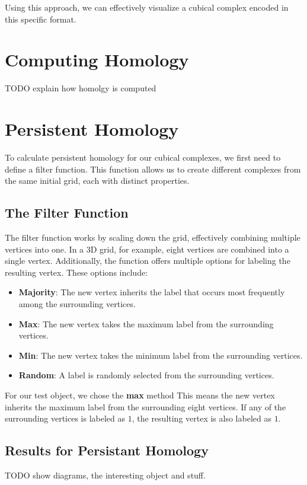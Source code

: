 \documentclass{article}
\begin{document}
    Using this approach, we can effectively visualize a cubical complex encoded in this specific format.

    \section{Computing Homology}
    TODO explain how homolgy is computed

    \section{Persistent Homology}
    To calculate persistent homology for our cubical complexes,
    we first need to define a filter function. This function allows us to
    create different complexes from the same initial grid, each with distinct properties.

    \subsection{The Filter Function}\label{subsec:filter}
    The filter function works by scaling down the grid, effectively combining
    multiple vertices into one. In a 3D grid, for example, eight vertices are
    combined into a single vertex. Additionally, the function offers multiple
    options for labeling the resulting vertex. These options include:
    \begin{itemize}
        \item \textbf{Majority}: The new vertex inherits the label that occurs most frequently among the surrounding vertices.
        \item \textbf{Max}: The new vertex takes the maximum label from the surrounding vertices.
        \item \textbf{Min}: The new vertex takes the minimum label from the surrounding vertices.
        \item \textbf{Random}: A label is randomly selected from the surrounding vertices.
    \end{itemize}

    For our test object, we chose the \textbf{max} method
    This means the new vertex inherits the maximum label from the surrounding eight vertices.
    If any of the surrounding vertices is labeled as $1$, the resulting vertex is also labeled as $1$.

    \subsection{Results for Persistant Homology}\label{subsec:resultsPers}
    TODO show diagrams, the interesting object and stuff.
    
\end{document}
